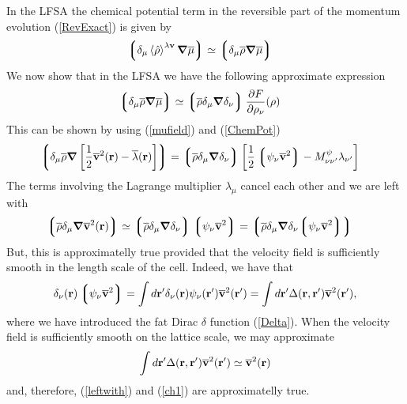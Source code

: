 \documentclass[b5paper,openright,10pt]{book}
\newcommand{\llangle}{\left\langle}
\newcommand{\rrangle}{\right\rangle}
\newcommand{\llg}{\left\lgroup}
\newcommand{\rlg}{\right\rgroup}
\begin{document}
\begin{appendices}
In the LFSA the chemical potential  term in the reversible part of the
momentum evolution (\ref{RevExact}) is given by
\begin{align}
  \llg\delta_\mu\llangle\hat{\rho}\rrangle^{\lambda{\bf v}}\boldsymbol{\nabla}\overline{\mu}\rlg
&\simeq\llg\delta_\mu\overline{\rho}\boldsymbol{\nabla}\overline{\mu}\rlg
\end{align}
We now show that in the LFSA we have the following approximate expression
  \begin{align}
  \llg\delta_\mu\overline{\rho}\boldsymbol{\nabla}\overline{\mu}\rlg&\simeq
\llg\overline{\rho}\delta_{\mu}\boldsymbol{\nabla}\delta_{\nu}\rlg
\frac{\partial  F}{\partial \rho_{\nu}}(\rho)
\label{ch1}
  \end{align}
This can be shown by using (\ref{mufield}) and (\ref{ChemPot})
  \begin{align}
  \llg\delta_\mu\overline{\rho}\boldsymbol{\nabla}\left[
\frac{1}{2}\overline{\bf v}^2({\bf r})-\overline{\lambda}({\bf r})\right]
\rlg&=
\llg\overline{\rho}\delta_{\mu}\boldsymbol{\nabla}\delta_{\nu}\rlg
\left[\frac{1}{2}\llg\psi_\nu\overline{\bf v}^2\rlg-  M^{\psi}_{\nu\nu'}\lambda_{\nu'}\right]
  \end{align}
The terms involving the Lagrange multiplier $\lambda_\mu$ cancel each other and we 
are left with 
\begin{align}
  \llg\overline{\rho}\delta_\mu\boldsymbol{\nabla}
\overline{\bf v}^2({\bf r})
\rlg&\simeq
\llg\overline{\rho}\delta_{\mu}\boldsymbol{\nabla}\delta_{\nu}\rlg
\llg\psi_\nu\overline{\bf v}^2\rlg
=\llg\overline{\rho}\delta_{\mu}\boldsymbol{\nabla}\delta_{\nu}{\llg\psi_\nu\overline{\bf v}^2\rlg}\rlg
\label{leftwith}
\end{align}
But, this is approximatelly true provided that the velocity field is sufficiently smooth
in the length scale of the cell. Indeed, we have that 
\begin{align}
\delta_{\nu}({\bf r})\llg\psi_\nu\overline{\bf v}^2\rlg=
\int d{\bf r}'
\delta_{\nu}({\bf r})\psi_\nu({\bf r}')\overline{\bf v}^2({\bf r}')=
\int d{\bf r}'
\Delta({\bf r},{\bf r}')\overline{\bf v}^2({\bf r}'),
\end{align}
where we have introduced the fat Dirac $\delta$ function (\ref{Delta}). When the
velocity field is sufficiently smooth on the lattice scale, we may approximate
\begin{align}
  \int d{\bf r}'
\Delta({\bf r},{\bf r}')\overline{\bf v}^2({\bf r}')\simeq \overline{\bf v}^2({\bf r})
\end{align}
and, therefore, (\ref{leftwith}) and (\ref{ch1}) are approximatelly true. 


\end{appendices}
\end{document}
